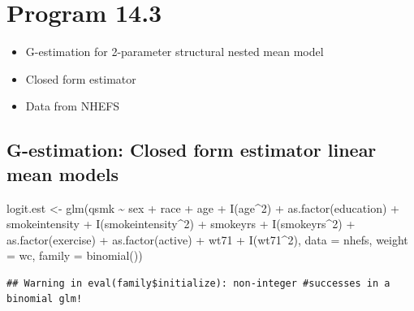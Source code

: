 \documentclass[
  10pt,
]{book}
\newenvironment{Shaded}{\begin{snugshade}}{\end{snugshade}}
\newcommand{\AttributeTok}[1]{\textcolor[rgb]{0.77,0.63,0.00}{#1}}
\newcommand{\DecValTok}[1]{\textcolor[rgb]{0.00,0.00,0.81}{#1}}
\newcommand{\FunctionTok}[1]{\textcolor[rgb]{0.00,0.00,0.00}{#1}}
\newcommand{\NormalTok}[1]{#1}
\newcommand{\OtherTok}[1]{\textcolor[rgb]{0.56,0.35,0.01}{#1}}
\newcommand{\SpecialCharTok}[1]{\textcolor[rgb]{0.00,0.00,0.00}{#1}}
\providecommand{\tightlist}{%
  \setlength{\itemsep}{0pt}\setlength{\parskip}{0pt}}
\begin{document}
\hypertarget{program-14.3}{%
\section{Program 14.3}\label{program-14.3}}

\begin{itemize}
\tightlist
\item
  G-estimation for 2-parameter structural nested mean model
\item
  Closed form estimator
\item
  Data from NHEFS
\end{itemize}

\hypertarget{g-estimation-closed-form-estimator-linear-mean-models}{%
\subsection{G-estimation: Closed form estimator linear mean models}\label{g-estimation-closed-form-estimator-linear-mean-models}}

\begin{Shaded}
\begin{Highlighting}[]
\NormalTok{logit.est }\OtherTok{\textless{}{-}} \FunctionTok{glm}\NormalTok{(qsmk }\SpecialCharTok{\textasciitilde{}}\NormalTok{ sex }\SpecialCharTok{+}\NormalTok{ race }\SpecialCharTok{+}\NormalTok{ age }\SpecialCharTok{+} \FunctionTok{I}\NormalTok{(age}\SpecialCharTok{\^{}}\DecValTok{2}\NormalTok{) }\SpecialCharTok{+} \FunctionTok{as.factor}\NormalTok{(education) }
                 \SpecialCharTok{+}\NormalTok{ smokeintensity }\SpecialCharTok{+} \FunctionTok{I}\NormalTok{(smokeintensity}\SpecialCharTok{\^{}}\DecValTok{2}\NormalTok{) }\SpecialCharTok{+}\NormalTok{ smokeyrs }
                 \SpecialCharTok{+} \FunctionTok{I}\NormalTok{(smokeyrs}\SpecialCharTok{\^{}}\DecValTok{2}\NormalTok{) }\SpecialCharTok{+} \FunctionTok{as.factor}\NormalTok{(exercise) }\SpecialCharTok{+} \FunctionTok{as.factor}\NormalTok{(active) }
                 \SpecialCharTok{+}\NormalTok{ wt71 }\SpecialCharTok{+} \FunctionTok{I}\NormalTok{(wt71}\SpecialCharTok{\^{}}\DecValTok{2}\NormalTok{), }\AttributeTok{data =}\NormalTok{ nhefs, }\AttributeTok{weight =}\NormalTok{ wc, }
                 \AttributeTok{family =} \FunctionTok{binomial}\NormalTok{())}
\end{Highlighting}
\end{Shaded}

\begin{verbatim}
## Warning in eval(family$initialize): non-integer #successes in a binomial glm!
\end{verbatim}
\end{document}
